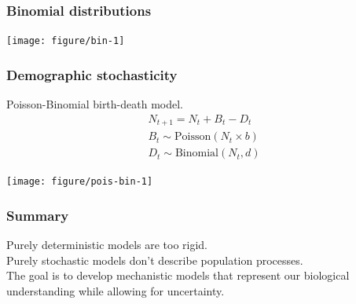 \documentclass[color=usenames,dvipsnames]{beamer}\usepackage[]{graphicx}\usepackage[]{xcolor}
\newenvironment{knitrout}{}{} %
\begin{document}
\begin{frame}[fragile]
  \frametitle{Binomial distributions}
\begin{knitrout}
\color{fgcolor}

{\centering \texttt{[image: figure/bin-1]} 

}


\end{knitrout}
\end{frame}


\begin{frame}[fragile]
  \frametitle{Demographic stochasticity}
  Poisson-Binomial birth-death model. %
  \small
  \begin{gather*}
    N_{t+1} = N_t + B_t - D_t \\
    B_t \sim \mathrm{Poisson}(N_t \times b) \\
    D_t \sim \mathrm{Binomial}(N_t, d)
  \end{gather*}
\begin{knitrout}
\color{fgcolor}

{\centering \texttt{[image: figure/pois-bin-1]} 

}


\end{knitrout}
\end{frame}


\begin{frame}
  \frametitle{Summary}
  \Large
  Purely deterministic models are too rigid. \\
  \vfill
  Purely stochastic models don't describe population processes. \\
  \vfill
  The goal is to develop mechanistic models that represent 
  our biological understanding while allowing for uncertainty. \\
\end{frame}










\end{document}
